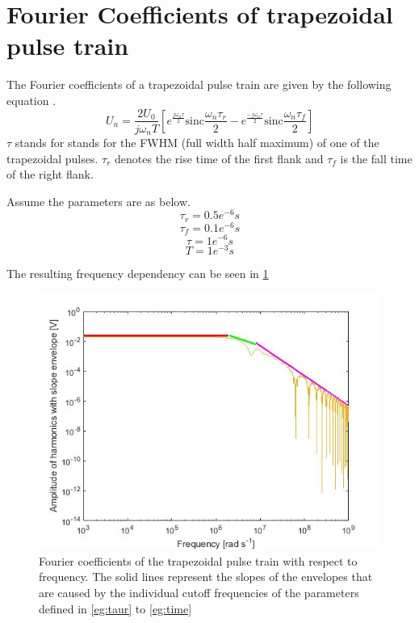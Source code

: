 \section{Fourier Coefficients of trapezoidal pulse  train }

The Fourier coefficients of a trapezoidal pulse train are given by the following equation \cite{FaerberMVISS}. 
\begin{equation}
 U_n = \frac{2 U_0}{j \omega_n T} [e^{\frac{j \omega_n \tau}{2}} \textrm{sinc}{\frac { \omega_n \tau_r }{2}} -e^{\frac{-j \omega_n \tau}{2}} \textrm{sinc}{\frac{ \omega_n \tau_f}{2}}]
\end{equation}
$\tau$ stands for stands for the FWHM (full width half maximum) of one of the trapezoidal pulses.
$\tau_r$ denotes the rise time of the first flank and $\tau_f$ is the fall time of the right flank.

Assume the parameters are as below.
\begin{equation}
\label{eg:taur}
 \tau_r = 0.5e^{-6 } s
  \end{equation}
  \begin{equation}
 \tau_f = 0.1e^{-6} s
  \end{equation}
 \begin{equation}
\tau= 1e^{-6} s
 \end{equation}
 \begin{equation}
 \label{eg:time}
  T=1e^{-3} s
 \end{equation}
 \newpage

The resulting frequency dependency can be seen in  \ref{fig.envelope}

\begin{figure}[H]
\includegraphics[width=\textwidth]{figures/Method/signal_simulation/envelope.jpg}
\caption[Kurze Abbildungsbeschreibung]{Fourier coefficients of the trapezoidal pulse train with respect to frequency. The solid lines represent the slopes of the envelopes that are caused by the individual 
cutoff frequencies of the parameters defined in \eqref{eg:taur} to \eqref{eg:time}}
\label{fig.envelope}
\end{figure}

